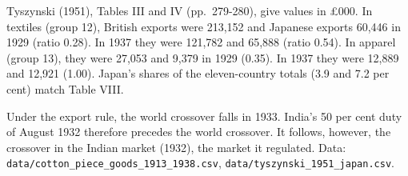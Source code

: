 Tyszynski (1951), Tables III and IV (pp.~279-280), give values in £000.
In textiles (group 12), British exports were 213,152 and Japanese
exports 60,446 in 1929 (ratio 0.28). In 1937 they were 121,782 and
65,888 (ratio 0.54). In apparel (group 13), they were 27,053 and 9,379
in 1929 (0.35). In 1937 they were 12,889 and 12,921 (1.00). Japan's
shares of the eleven-country totals (3.9 and 7.2 per cent) match Table
VIII.

Under the export rule, the world crossover falls in 1933. India's 50 per
cent duty of August 1932 therefore precedes the world crossover. It
follows, however, the crossover in the Indian market (1932), the market
it regulated. Data: \texttt{data/\allowbreak{}cotton\_\allowbreak{}piece\_\allowbreak{}goods\_\allowbreak{}1913\_\allowbreak{}1938.csv},
\texttt{data/\allowbreak{}tyszynski\_\allowbreak{}1951\_\allowbreak{}japan.csv}.

